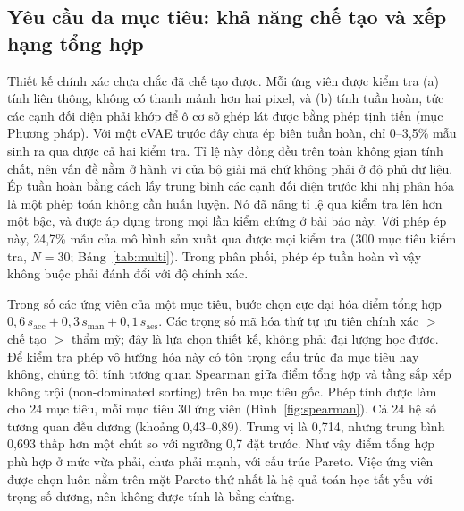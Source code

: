 \documentclass[a4paper,11pt]{article}
\begin{document}
\subsection{Yêu cầu đa mục tiêu: khả năng chế tạo và xếp hạng tổng hợp}

Thiết kế chính xác chưa chắc đã chế tạo được. Mỗi ứng viên được kiểm tra
(a) tính liên thông, không có thanh mảnh hơn hai pixel, và (b) tính tuần
hoàn, tức các cạnh đối diện phải khớp để ô cơ sở ghép lát được bằng phép
tịnh tiến (mục Phương pháp). Với một cVAE trước đây chưa ép biên tuần hoàn,
chỉ 0--3,5\% mẫu sinh ra qua được cả hai kiểm tra. Tỉ lệ này đồng đều trên
toàn không gian tính chất, nên vấn đề nằm ở hành vi của bộ giải mã chứ không
phải ở độ phủ dữ liệu. Ép tuần hoàn bằng cách lấy trung bình các cạnh đối
diện trước khi nhị phân hóa là một phép toán không cần huấn luyện. Nó đã
nâng tỉ lệ qua kiểm tra lên hơn một bậc, và được áp dụng trong mọi lần kiểm
chứng ở bài báo này. Với phép ép này, 24,7\% mẫu của mô hình sản xuất qua
được mọi kiểm tra (300 mục tiêu kiểm tra, $N=30$; Bảng~\ref{tab:multi}).
Trong phân phối, phép ép tuần hoàn vì vậy không buộc phải đánh đổi với độ
chính xác.

Trong số các ứng viên của một mục tiêu, bước chọn cực đại hóa điểm tổng hợp
$0{,}6\,s_{\mathrm{acc}}+0{,}3\,s_{\mathrm{man}}+0{,}1\,s_{\mathrm{aes}}$.
Các trọng số mã hóa thứ tự ưu tiên chính xác $>$ chế tạo $>$ thẩm mỹ; đây
là lựa chọn thiết kế, không phải đại lượng học được. Để kiểm tra phép vô
hướng hóa này có tôn trọng cấu trúc đa mục tiêu hay không, chúng tôi tính
tương quan Spearman giữa điểm tổng hợp và tầng sắp xếp không trội
(non-dominated sorting) trên ba mục tiêu gốc. Phép tính được làm cho 24 mục
tiêu, mỗi mục tiêu 30 ứng viên (Hình~\ref{fig:spearman}). Cả 24 hệ số tương
quan đều dương (khoảng 0,43--0,89). Trung vị là 0,714, nhưng trung bình
0,693 thấp hơn một chút so với ngưỡng 0,7 đặt trước. Như vậy điểm tổng hợp
phù hợp ở mức vừa phải, chưa phải mạnh, với cấu trúc Pareto. Việc ứng viên
được chọn luôn nằm trên mặt Pareto thứ nhất là hệ quả toán học tất yếu với
trọng số dương, nên không được tính là bằng chứng.
\end{document}
